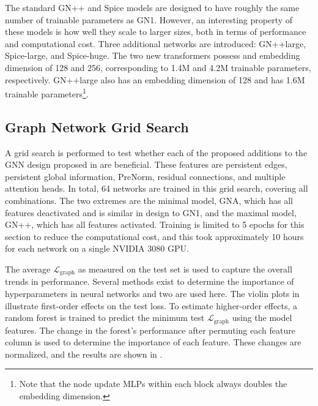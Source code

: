 The standard GN++ and Spice models are designed to have roughly the same number of trainable parameters as GN1.
However, an interesting property of these models is how well they scale to larger sizes, both in terms of performance and computational cost.
Three additional networks are introduced: GN++large, Spice-large, and Spice-huge.
The two new transformers possess and embedding dimension of 128 and 256, corresponding to 1.4M and 4.2M trainable parameters, respectively.
GN++large also has an embedding dimension of 128 and has 1.6M trainable parameters\footnote{Note that the node update MLPs within each block always doubles the embedding dimension.}.

\subsection{Graph Network Grid Search}

A grid search is performed to test whether each of the proposed additions to the GNN design proposed in  are beneficial.
These features are persistent edges, persistent global information, PreNorm, residual connections, and multiple attention heads.
In total, 64 networks are trained in this grid search, covering all combinations.
The two extremes are the minimal model, GNA, which has all features deactivated and is similar in design to GN1, and the maximal model, GN++, which has all features activated.
Training is limited to 5 epochs for this section to reduce the computational cost, and this took approximately 10 hours for each network on a single NVIDIA 3080 GPU\@.

The average $\mathcal{L}_{\text{graph}}$ as measured on the test set is used to capture the overall trends in performance.
Several methods exist to determine the importance of hyperparameters in neural networks and two are used here.
The violin plots in  illustrate first-order effects on the test loss.
To estimate higher-order effects, a random forest is trained to predict the minimum test $\mathcal{L}_{\text{graph}}$ using the model features.
The change in the forest's performance after permuting each feature column is used to determine the importance of each feature.
These changes are normalized, and the results are shown in .

